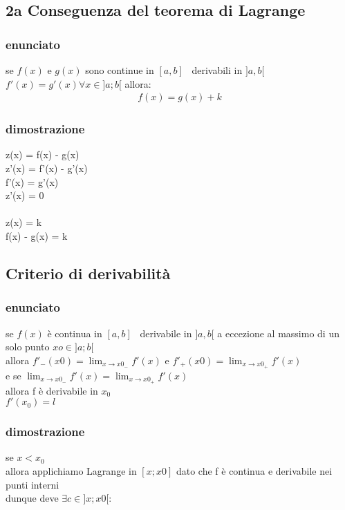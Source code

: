 \documentclass[a4paper,11pt]{article}
\begin{document}
\subsection{ 2a Conseguenza del teorema di Lagrange}
\subsubsection{enunciato}

se \(f(x)\) e \(g(x)\) sono continue in \([a,b]\) \, derivabili in \(]a,b[\)  \,  \( f'(x)=g'(x) \forall x \in ]a;b[ \)
allora:
\begin{align}
      f(x) = g(x) + k 
\end{align}

\subsubsection{dimostrazione}
\begin{center}
z(x) = f(x) - g(x)  
\\
z'(x) = f'(x) - g'(x) 
\\
f'(x) = g'(x)  
\\
z'(x) = 0  \text{\(  \forall x \in ]a;b[ \)}
\\
\\
z(x) = k  
\\
f(x) - g(x) = k
\end{center}

\subsection{Criterio di derivabilità}


\subsubsection{enunciato}

se \(f(x)\) è continua in \([a,b]\) \, derivabile in \(]a,b[\)  a eccezione al massimo di un solo punto \( xo \in ]a;b[\)
\\
allora \(  f'_- (x0) = \lim_{x \to x0_-} f'(x)  \) e \(  f'_+ (x0) = \lim_{x \to x0_+} f'(x)  \)
\\
e se \(  \lim_{x \to x0_-} f'(x) = \lim_{x \to x0_+} f'(x) \)
\\
allora f è derivabile in \(x_0\)
\\
\( f'(x_0) = l \)

\subsubsection{dimostrazione}
se  \(x < x_0\)
    \\
allora  applichiamo Lagrange in \([x;x0]\) dato che f è continua e derivabile nei punti interni  
\\
dunque deve \( \exists c \in ]x;x0[  :  \)
\\
\end{document}
